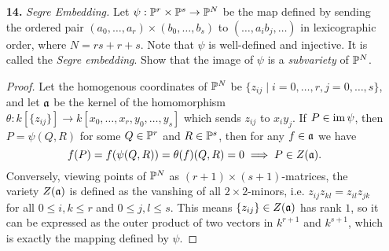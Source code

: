 \documentclass{article}
\begin{document}
\begin{enumerate} [label=\textbf{\arabic*.}, leftmargin=0cm]
\begin{proof}
\begin{itemize} [leftmargin=0cm]
        \item[(d)] Let $(S, T)$ and $(X, Y, Z, W)$ be homogenous coordinates of $\PP^1$ and $\PP^3$, respectively. Then, the $3$-uple embedding of $\PP^1$ in $\PP^3$ is given by
        \begin{equation*}
            (S, T) \mapsto (S^3, S^2 T, ST^2, T^3).
        \end{equation*}
        Let $Y$ be the twisted cubic curve in $\A^3$ and let $\overline{Y}$ be its projective closure in $\PP^3$, then we have
        \begin{equation*}
            \varphi_3^{-1}(Y) = \left\{ \bigg( \frac{u}{v}, \frac{u^2}{v^2}, \frac{u^3}{v^3}, 1 \bigg) \bigg| u, v \in k, ~ v \neq 0 \right\} \implies \overline{Y} = \{ (u^3, u^2v, uv^2, v^3) \mid u, v \in k \}.
        \end{equation*}
    \end{itemize}
\end{proof}


\item[\textbf{14.}] \textit{Segre Embedding.} Let $\psi : \mathbb{P}^r \times \mathbb{P}^s \to \mathbb{P}^N$ be the map defined by sending the ordered pair $(a_0, \dots, a_r) \times (b_0, \dots, b_s)$ to $(\dots, a_i b_j, \dots)$ in lexicographic order, where $N = rs + r + s$. Note that $\psi$ is well-defined and injective. It is called the \textit{Segre embedding}. Show that the image of $\psi$ is a \textit{subvariety} of $\mathbb{P}^N$.

\begin{proof}
    Let the homogenous coordinates of $\mathbb{P}^N$ be $\{ z_{ij} \mid i = 0, \dots, r, j = 0, \dots, s \}$, and let $\mathfrak{a}$ be the kernel of the homomorphism $\theta : k[\{ z_{ij} \}] \to k[x_0, \dots, x_r, y_0, \dots, y_s]$ which sends $z_{ij}$ to $x_i y_j$. If $P \in \operatorname{im}{\psi}$, then $P = \psi(Q, R)$ for some $Q \in \mathbb{P}^r$ and $R \in \mathbb{P}^s$, then for any $f \in \mathfrak{a}$ we have
    \begin{equation*}
        f(P) = f(\psi(Q, R)) = \theta(f)(Q, R) = 0 \implies P \in Z(\mathfrak{a}).
    \end{equation*}
    Conversely, viewing points of $\mathbb{P}^N$ as $(r + 1)\times(s + 1)$-matrices, the variety $Z(\mathfrak{a})$ is defined as the vanshing of all $2\times2$-minors, i.e. $z_{ij}z_{kl} = z_{il}z_{jk}$ for all $0 \leq i, k \leq r$ and $0 \leq j, l \leq s$. This means $\{ z_{ij} \} \in Z(\mathfrak{a})$ has rank $1$, so it can be expressed as the outer product of two vectors in $k^{r + 1}$ and $k^{s + 1}$, which is exactly the mapping defined by $\psi$.
\end{proof}


\end{enumerate}
\end{document}
